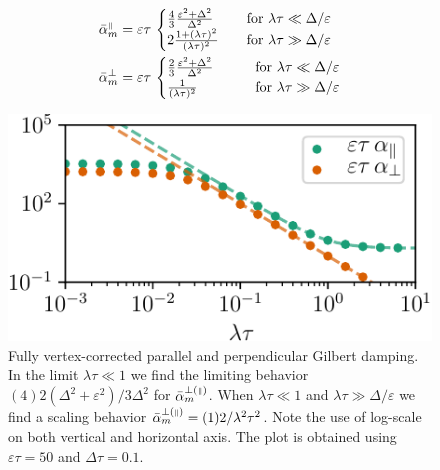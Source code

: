 \begin{align}
\label{eq:alphapara}
    \bar{\alpha}_m^{{\scriptscriptstyle\parallel}} &= 
    {\varepsilon\tau}\,  \begin{cases}
        \frac{4}{3}\frac{\varepsilon^2+\Delta^2}{\Delta^2}
            &\quad \text{for } \lambda\tau        \ll \Delta/\varepsilon\\
        2\frac{1+(\lambda\tau)^2}{(\lambda\tau)^2}
            &\quad \text{for } \lambda\tau \gg \Delta/\varepsilon 
    \end{cases}\\
    \label{eq:alphaperp}
    \bar{\alpha}_m^{\perp} &= {\varepsilon\tau}\,
    \begin{cases}
        \frac{2}{3}\frac{\varepsilon^2+\Delta^2}{\Delta^2}
            \quad\quad &\text{for } \lambda\tau        \ll \Delta/\varepsilon\\
        \frac{1}{(\lambda\tau)^2}
            \quad &\text{for } \lambda\tau \gg \Delta/\varepsilon 
    \end{cases}
\end{align}
\begin{figure}
    \centering
    \includegraphics[width=0.6\linewidth]{gfx/alpha_full2}
    \caption{Fully vertex-corrected parallel and perpendicular Gilbert damping. In the limit $\lambda\tau\ll1$ we find the limiting behavior $(4)2(\Delta^2+\varepsilon^2)/3\Delta^2$ for $\bar{\alpha}_m^{\perp({\scriptscriptstyle\parallel})}$. When $\lambda\tau\ll 1$ and $\lambda\tau\gg\Delta/\varepsilon$ we find a scaling behavior $\bar{\alpha}_m^{\perp({\scriptscriptstyle\parallel})}=(1)2/\lambda^2\tau^2$. Note the use of log-scale on both vertical and horizontal axis. The plot is obtained using $\varepsilon\tau=50$ and $\Delta\tau=0.1$. }
    \label{fig:alpha_plot}
\end{figure}



